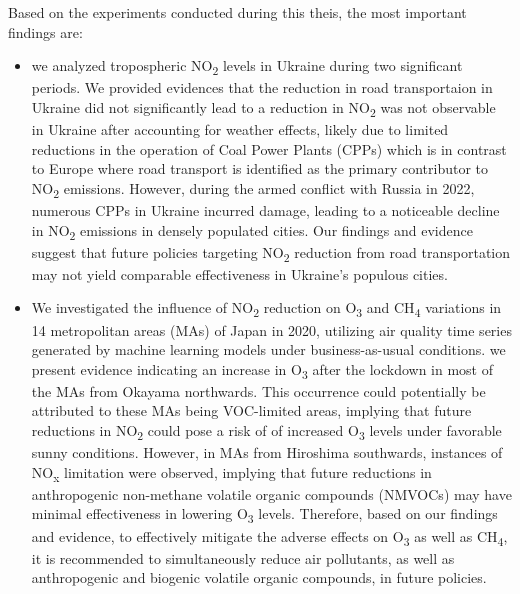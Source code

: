 Based on the experiments conducted during this theis, the most important findings are: \par
\begin{itemize}
    \item we analyzed tropospheric NO\textsubscript{2} levels in Ukraine during two significant periods. We provided evidences that the reduction in road transportaion in Ukraine did not significantly lead to a reduction in NO\textsubscript{2} was not observable in Ukraine after accounting for weather effects, likely due to limited reductions in the operation of Coal Power Plants (CPPs) which is in contrast to Europe where road transport is identified as the primary contributor to NO\textsubscript{2} emissions. However, during the armed conflict with Russia in 2022, numerous CPPs in Ukraine incurred damage, leading to a noticeable decline in NO\textsubscript{2} emissions in densely populated cities. Our findings and evidence suggest that future policies targeting NO\textsubscript{2} reduction from road transportation may not yield comparable effectiveness in Ukraine's populous cities.
    \item We investigated the influence of NO\textsubscript{2} reduction on O\textsubscript{3} and CH\textsubscript{4} variations in 14 metropolitan areas (MAs) of Japan in 2020, utilizing air quality time series generated by machine learning models under business-as-usual conditions. we present evidence indicating an increase in O\textsubscript{3} after the lockdown in most of the MAs from Okayama northwards. This occurrence could potentially be attributed to these MAs being VOC-limited areas, implying that future reductions in NO\textsubscript{2} could pose a risk of of increased O\textsubscript{3} levels under favorable sunny conditions. However, in MAs from Hiroshima southwards, instances of NO\textsubscript{x} limitation were observed, implying that future reductions in anthropogenic non-methane volatile organic compounds (NMVOCs) may have minimal effectiveness in lowering O\textsubscript{3} levels. Therefore, based on our findings and evidence, to effectively mitigate the adverse effects on O\textsubscript{3} as well as CH\textsubscript{4}, it is recommended to simultaneously reduce air pollutants, as well as anthropogenic and biogenic volatile organic compounds, in future policies.

\end{itemize}
